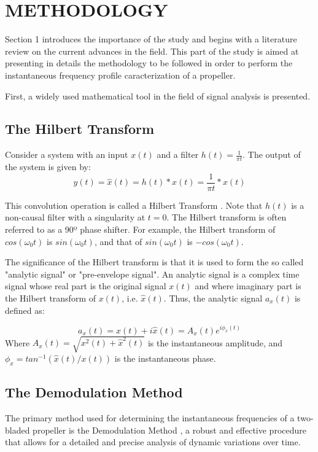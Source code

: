 \documentclass[10pt,fleqn,a4paper,twoside]{article}
\begin{document}
\section{METHODOLOGY}
Section 1 introduces the importance of the study and begins with a literature review on the current advances in the field. This part of the study is aimed at presenting in details the methodology to be followed in order to perform the instantaneous frequency profile caracterization of a propeller.

First, a widely used mathematical tool in the field of signal analysis is presented. 

\subsection{The Hilbert Transform}

Consider a system with an input $x(t)$ and a filter $h(t) = \frac{1}{\pi t}$. The output of the system is given by:
\begin{equation}
    y(t) = \hat{x}(t) =  h(t) * x(t) = \frac{1}{\pi t} * x(t)
    \label{eq1}
\end{equation}

This convolution operation is called a Hilbert Transform \citep{shin}. Note that $h(t)$ is a non-causal filter with a singularity at $t=0$. The Hilbert transform is often referred to as a 90º phase shifter. For example, the Hilbert transform of $cos(\omega_{0} t)$ is $sin(\omega_{0} t)$, and that of $sin(\omega_{0} t)$ is $-cos(\omega_{0} t)$.

The significance of the Hilbert transform is that it is used to form the so called "analytic signal" or "pre-envelope signal". An analytic signal is a complex time signal whose real part is the original signal $x(t)$ and where imaginary part is the Hilbert transform of $x(t)$, i.e. $\hat{x}(t)$. Thus, the analytic signal $a_{x} (t)$ is defined as:

\begin{equation}
    a_{x} (t) = x(t) + i\hat{x}(t) = A_{x}(t)e^{i\phi_{x}(t)}
    \label{eq2}
\end{equation}
Where $A_{x}(t) = \sqrt{x^2 (t)+ \hat{x}^2 (t)}$ is the instantaneous amplitude, and $\phi_{x} = tan^{-1}(\hat{x}(t)/x(t))$ is the instantaneous phase.

\subsection{The Demodulation Method}
The primary method used for determining the instantaneous frequencies of a two-bladed propeller is the Demodulation Method \citep{BONNARDOT2005766}, a robust and effective procedure that allows for a detailed and precise analysis of dynamic variations over time.
\end{document}
